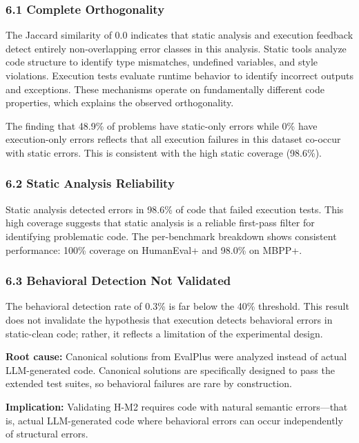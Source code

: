 
\subsubsection{6.1 Complete Orthogonality}

The Jaccard similarity of 0.0 indicates that static analysis and execution feedback detect entirely non-overlapping error classes in this analysis. Static tools analyze code structure to identify type mismatches, undefined variables, and style violations. Execution tests evaluate runtime behavior to identify incorrect outputs and exceptions. These mechanisms operate on fundamentally different code properties, which explains the observed orthogonality.

The finding that 48.9\% of problems have static-only errors while 0\% have execution-only errors reflects that all execution failures in this dataset co-occur with static errors. This is consistent with the high static coverage (98.6\%).

\subsubsection{6.2 Static Analysis Reliability}

Static analysis detected errors in 98.6\% of code that failed execution tests. This high coverage suggests that static analysis is a reliable first-pass filter for identifying problematic code. The per-benchmark breakdown shows consistent performance: 100\% coverage on HumanEval+ and 98.0\% on MBPP+.

\subsubsection{6.3 Behavioral Detection Not Validated}

The behavioral detection rate of 0.3\% is far below the 40\% threshold. This result does not invalidate the hypothesis that execution detects behavioral errors in static-clean code; rather, it reflects a limitation of the experimental design.

\textbf{Root cause:} Canonical solutions from EvalPlus were analyzed instead of actual LLM-generated code. Canonical solutions are specifically designed to pass the extended test suites, so behavioral failures are rare by construction.

\textbf{Implication:} Validating H-M2 requires code with natural semantic errors---that is, actual LLM-generated code where behavioral errors can occur independently of structural errors.

